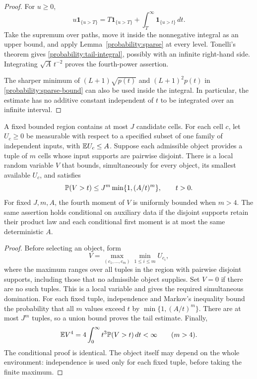 \begin{proof}
For $u\ge0$,
\[
 u\mathbf1_{\{u>T\}}
 =T\mathbf1_{\{u>T\}}+
       \int_T^\infty\mathbf1_{\{u>t\}}\,dt.
\]
Take the supremum over paths, move it inside the nonnegative
integral as an upper bound, and apply
Lemma~\ref{probability:sparse} at every level.  Tonelli's theorem
gives \eqref{probability:tail-integral}, possibly with an infinite
right-hand side.  Integrating $\sqrt A\,t^{-2}$ proves the
fourth-power assertion.

The sharper minimum of $(L+1)\sqrt{p(t)}$ and $(L+1)^2p(t)$
in \eqref{probability:sparse-bound} can also be used inside the
integral.  In particular, the estimate has no additive constant
independent of $t$ to be integrated over an infinite interval.
\end{proof}

\begin{lemma}
\label{probability:candidates}
A fixed bounded region contains at most $J$ candidate cells.  For
each cell $c$, let $U_c\ge0$ be measurable with respect to a
specified subset of one family of independent inputs, with
$\mathbb E U_c\le A$.  Suppose each admissible object provides a tuple
of $m$ cells whose input supports are pairwise disjoint.  There is
a local random variable $V$ that bounds, simultaneously for every
object, its smallest available $U_c$, and satisfies
\[
 \mathbb P(V>t)\le J^m\min\{1,(A/t)^m\},\qquad t>0.
\]
For fixed $J,m,A$, the fourth moment of $V$ is uniformly bounded
when $m>4$.  The same assertion holds conditional on auxiliary
data if the disjoint supports retain their product law and each
conditional first moment is at most the same deterministic $A$.
\end{lemma}

\begin{proof}
Before selecting an object, form
\[
 V=\max_{(c_1,\ldots,c_m)}\min_{1\le i\le m}U_{c_i},
\]
where the maximum ranges over all tuples in the region with
pairwise disjoint supports, including those that no admissible
object supplies.  Set $V=0$ if there are no such tuples.  This is
a local variable and gives the required simultaneous domination.
For each fixed tuple, independence and Markov's inequality bound
the probability that all $m$ values exceed $t$ by
$\min\{1,(A/t)^m\}$.  There are at most $J^m$ tuples, so a
union bound proves the tail estimate.  Finally,
\[
 \mathbb E V^4=4\int_0^\infty t^3\mathbb P(V>t)\,dt<\infty
 \qquad(m>4).
\]
The conditional proof is identical.  The object itself may depend
on the whole environment: independence is used only for each
fixed tuple, before taking the finite maximum.
\end{proof}

